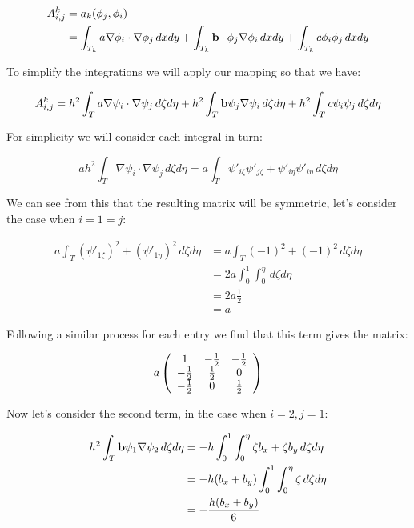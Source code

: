 \begin{align*}
    A^k_{i,j} &= a_k(\phi_j, \phi_i) \\
     &= \int_{T_k}a\nabla\phi_i\cdot\nabla\phi_j\,dxdy +
        \int_{T_k}\mathbf{b}\cdot\phi_j\nabla\phi_i\,dxdy +
        \int_{T_k}c\phi_i\phi_j\,dxdy
\end{align*}

To simplify the integrations we will apply our mapping so that we have:

\[
    A^k_{i,j} = h^2\int_Ta\nabla\psi_i\cdot\nabla\psi_j\,d\zeta d\eta +
                h^2\int_T\mathbf{b}\psi_j\nabla\psi_i\,d\zeta d\eta +
                h^2\int_Tc\psi_i\psi_j\,d\zeta d\eta
\]

For simplicity we will consider each integral in turn:

\[
    ah^2\int_T\nabla\psi_i\cdot\nabla\psi_j\,d\zeta d\eta =
    a\int_T\psi'_{i\zeta}\psi'_{j\zeta} +
        \psi'_{i\eta}\psi'_{i\eta}\,d\zeta d\eta
\]

We can see from this that the resulting matrix will be symmetric, let's
consider the case when $i = 1 = j$:

\begin{align*}
    a\int_T(\psi'_{1\zeta})^2 + (\psi'_{1\eta})^2\,d\zeta d\eta & =
        a\int_T(-1)^2 + (-1)^2\,d\zeta d\eta \\
    &= 2a\int_0^1\int_0^\eta\,d\zeta d\eta \\
    &= 2a\frac{1}{2} \\
    &= a
\end{align*}

Following a similar process for each entry we find that this term gives the
matrix:

\begin{equation}\label{eq:stiffness_term_1}
    a\left(\begin{array}{c c c}
        1      & -\frac{1}{2} & -\frac{1}{2} \\
        -\frac{1}{2} & \frac{1}{2}  & 0 \\
        -\frac{1}{2} & 0      & \frac{1}{2}
    \end{array}\right)
\end{equation}

Now let's consider the second term, in the case when $i = 2, j = 1$:

\begin{align*}
    h^2\int_T{\mathbf{b}\psi_1\nabla\psi_2}\, d\zeta d\eta &=
    -h\int_0^1\int_0^\eta{\zeta b_x + \zeta b_y}\, d\zeta d\eta \\
    &= -h(b_x + b_y)\int_0^1\int_0^\eta{\zeta}\, d\zeta d\eta \\
    &= -\frac{h(b_x + b_y)}{6}
\end{align*}

